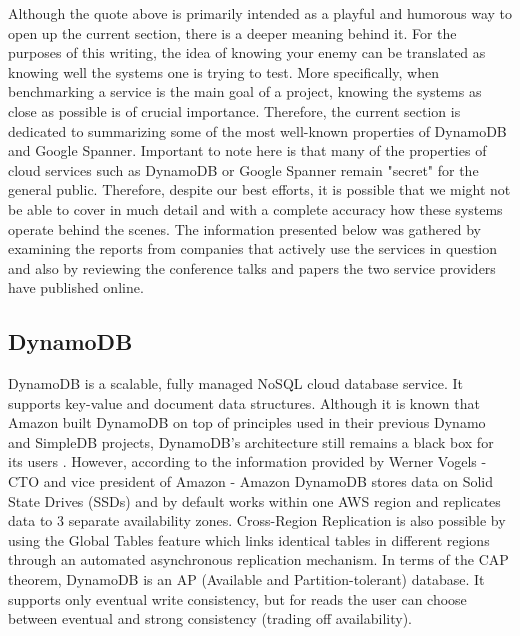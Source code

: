 \documentclass[letterpaper, 10 pt, conference]{ieeeconf}  %
\begin{document}
Although the quote above is primarily intended as a playful and humorous way to open up the current section, there is a deeper meaning behind it. For the purposes of this writing, the idea of knowing your enemy can be translated as knowing well the systems one is trying to test. More specifically, when benchmarking a service is the main goal of a project, knowing the systems as close as possible is of crucial importance. Therefore, the current section is dedicated to summarizing some of the most well-known properties of DynamoDB and Google Spanner. Important to note here is that many of the properties of cloud services such as DynamoDB or Google Spanner remain "secret" for the general public. Therefore, despite our best efforts, it is possible that we might not be able to cover in much detail and with a complete accuracy how these systems operate behind the scenes. The information presented below was gathered by examining the reports from companies that actively use the services in question and also by reviewing the conference talks and papers the two service providers have published online.

\subsection{DynamoDB}
DynamoDB is a scalable, fully managed NoSQL cloud database service. It supports key-value and document data structures. Although it is known that Amazon built DynamoDB on top of principles used in their previous Dynamo \cite{DeCandia:2007:DAH:1323293.1294281} and SimpleDB projects, DynamoDB's architecture still remains a black box for its users \cite{Allthings}. However, according to the information provided by Werner Vogels \cite{Allthings} - CTO and vice president of Amazon - Amazon DynamoDB stores data on Solid State Drives (SSDs) and by default works within one AWS region and replicates data to 3 separate availability zones. Cross-Region Replication is also possible by using the Global Tables feature which links identical tables in different regions through an automated asynchronous replication mechanism. In terms of the CAP theorem, DynamoDB is an AP (Available and Partition-tolerant) database. It supports only eventual write consistency, but for reads the user can choose between eventual and strong consistency (trading off availability). 
\end{document}
